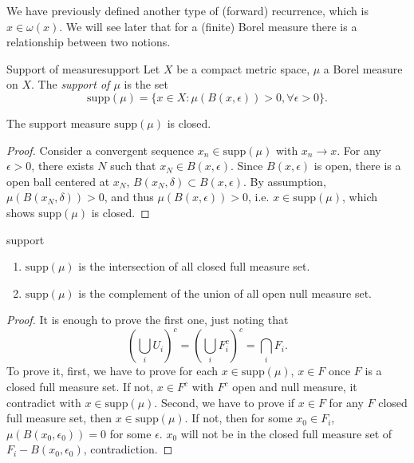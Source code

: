 \documentclass[12pt,a4paper]{article}
\begin{document}
	We have previously defined another type of (forward) recurrence, which is $x\in \omega(x)$. We will see later that for a (finite) Borel measure there is a relationship between two notions. 
	
	\newcommand{\supp}{\text{supp}}
	\begin{definition}{Support of measure}{support}
		Let $X$ be a compact metric space, $\mu$ a Borel measure on $X$. The \emph{support of $\mu$} is the set
		$$
		\supp(\mu) = \{x\in X: \mu(B(x,\epsilon))>0,\forall \epsilon>0\}.
		$$
	\end{definition}

	\begin{proposition}{}{}
		The support measure $\supp(\mu)$ is closed.
	\end{proposition}
	
	\begin{proof}
		Consider a convergent sequence $x_n\in \supp(\mu)$ with $x_n\to x$. For any $\epsilon>0$, there exists $N$ such that $x_N\in B(x,\epsilon)$. Since $B(x,\epsilon)$ is open, there is a open ball centered at $x_N$, $B(x_N, \delta)\subset B(x,\epsilon)$. By assumption, $\mu(B(x_N, \delta))>0$, and thus $\mu(B(x,\epsilon))>0$, i.e. $x\in \supp(\mu)$, which shows $\supp(\mu)$ is closed.
	\end{proof}
	
	\begin{proposition}{}{support}
		\begin{enumerate}
			\item $\supp(\mu)$ is the intersection of all closed full measure set.
			\item $\supp(\mu)$ is the complement of the union of all open null measure set.
		\end{enumerate}
	\end{proposition}

	\begin{proof}
		It is enough to prove the first one, just noting that
		$$
		\left(\bigcup_i U_i\right)^c=\left(\bigcup_i F^c_i\right)^c=\bigcap_i F_i.
		$$
		To prove it, first, we have to prove for each $x\in \supp(\mu)$, $x\in F$ once $F$ is a closed full measure set. If not, $x\in F^c$ with $F^c$ open and null measure, it contradict with $x\in \supp(\mu)$. Second, we have to prove if $x\in F$ for any $F$ closed full measure set, then $x\in \supp(\mu)$. If not, then for some $x_0\in F_i$, $\mu(B(x_0,\epsilon_0))=0$ for some $\epsilon$. $x_0$ will not be in the closed full measure set of $F_i-B(x_0,\epsilon_0)$, contradiction.
	\end{proof}
\end{document}
